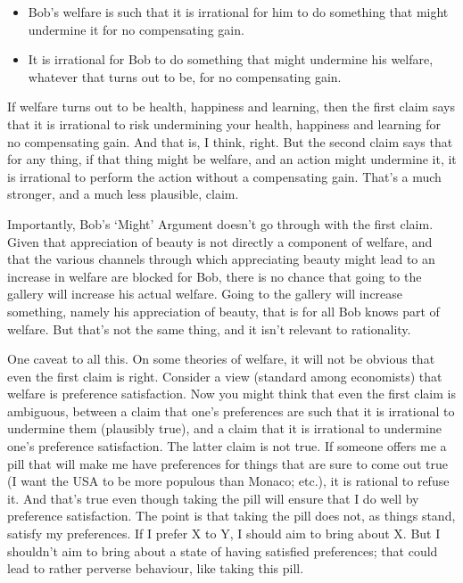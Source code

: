 \begin{itemize}
\item Bob's welfare is such that it is irrational for him to do something that might undermine it for no compensating gain.

\item It is irrational for Bob to do something that might undermine his welfare, whatever that turns out to be, for no compensating gain.

\end{itemize}
If welfare turns out to be health, happiness and learning, then the first claim says that it is irrational to risk undermining your health, happiness and learning for no compensating gain. And that is, I think, right. But the second claim says that for any thing, if that thing might be welfare, and an action might undermine it, it is irrational to perform the action without a compensating gain. That's a much stronger, and a much less plausible, claim.

Importantly, Bob's `Might' Argument doesn't go through with the first claim. Given that appreciation of beauty is not directly a component of welfare, and that the various channels through which appreciating beauty might lead to an increase in welfare are blocked for Bob, there is no chance that going to the gallery will increase his actual welfare. Going to the gallery will increase something, namely his appreciation of beauty, that is for all Bob knows part of welfare. But that's not the same thing, and it isn't relevant to rationality.

One caveat to all this. On some theories of welfare, it will not be obvious that even the first claim is right. Consider a view (standard among economists) that welfare is preference satisfaction. Now you might think that even the first claim is ambiguous, between a claim that one's preferences are such that it is irrational to undermine them (plausibly true), and a claim that it is irrational to undermine one's preference satisfaction. The latter claim is not true. If someone offers me a pill that will make me have preferences for things that are sure to come out true (I want the USA to be more populous than Monaco; etc.), it is rational to refuse it. And that's true even though taking the pill will ensure that I do well by preference satisfaction. The point is that taking the pill does not, as things stand, satisfy my preferences. If I prefer X to Y, I should aim to bring about X. But I shouldn't aim to bring about a state of having satisfied preferences; that could lead to rather perverse behaviour, like taking this pill.

